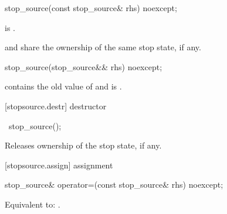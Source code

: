 {%

%
\begin{itemdecl}
stop_source(const stop_source& rhs) noexcept;
\end{itemdecl}
\begin{itemdescr}

  \pnum\postconditions {} is .
    \begin{note}  and  share the ownership of the
                 same stop state, if any.  \end{note}
\end{itemdescr}

%
\begin{itemdecl}
stop_source(stop_source&& rhs) noexcept;
\end{itemdecl}
\begin{itemdescr}
  \pnum\postconditions {} contains the old value of  and
                         is .
\end{itemdescr}

[stopsource.destr]{ destructor}

%
\begin{itemdecl}
~stop_source();
\end{itemdecl}

\begin{itemdescr}
 \pnum\effects Releases ownership of the stop state, if any.
\end{itemdescr}

[stopsource.assign]{ assignment}

%
\begin{itemdecl}
stop_source& operator=(const stop_source& rhs) noexcept;
\end{itemdecl}
\begin{itemdescr}
  \pnum\effects Equivalent to: .


\end{itemdescr}}
